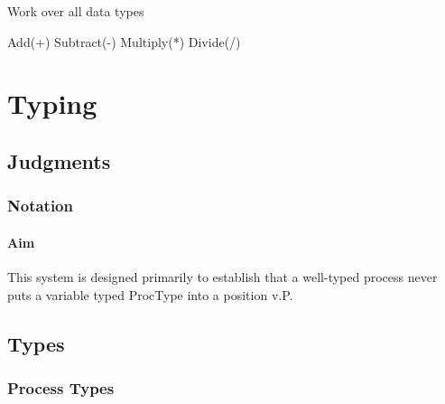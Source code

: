 Work over all data types

Add(+)
Subtract(-)
Multiply(*)
Divide(/)

\section{Typing}

\subsection{Judgments}




\subsubsection{Notation}










\paragraph{Aim}

This system is designed primarily to establish that a well-typed process never
puts a variable typed ProcType into a position v.P.

\subsection{Types}

\subsubsection{Process Types}

